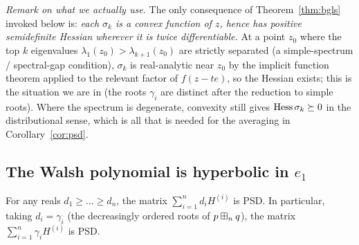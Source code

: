 \noindent\emph{Remark on what we actually use.} The only consequence of
Theorem~\ref{thm:bgls} invoked below is: \emph{each $\sigma_k$ is a convex
function of $z$, hence has positive semidefinite Hessian wherever it is twice
differentiable.} At a point $z_0$ where the top $k$ eigenvalues
$\lambda_1(z_0)>\lambda_{k+1}(z_0)$ are strictly separated (a simple-spectrum /
spectral-gap condition), $\sigma_k$ is real-analytic near $z_0$ by the implicit
function theorem applied to the relevant factor of $f(z-te)$, so the Hessian
exists; this is the situation we are in (the roots $\gamma_i$ are distinct after
the reduction to simple roots). Where the spectrum is degenerate, convexity
still gives $\operatorname{Hess}\sigma_k\succeq 0$ in the distributional sense, which is
all that is needed for the averaging in Corollary~\ref{cor:psd}.

\subsection*{The Walsh polynomial is hyperbolic in $e_1$}

\begin{qfourcorollary}\label{cor:psd}
For any reals $d_1\ge\dots\ge d_n$, the matrix $\sum_{i=1}^n d_i H^{(i)}$ is PSD.
In particular, taking $d_i=\gamma_i$ (the decreasingly ordered roots of
$p\boxplus_n q$), the matrix $\sum_{i=1}^n\gamma_i H^{(i)}$ is PSD.
\end{qfourcorollary}

